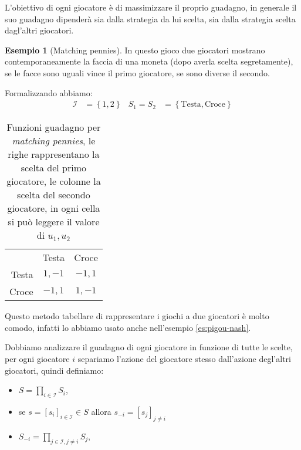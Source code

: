 \documentclass[a4paper]{article}
\newcounter{counter1}
\theoremstyle{plain}
\theoremstyle{definition}
\newtheorem{myes}[counter1]{Esempio}
\theoremstyle{remark}
\newcommand{\set}[1]{\left\{#1\right\}}
\newcommand{\bra}[1]{\left[#1\right]}
\begin{document}
L'obiettivo di ogni giocatore è di massimizzare il proprio guadagno,
in generale il suo guadagno dipenderà sia dalla strategia da lui
scelta, sia dalla strategia scelta dagl'altri giocatori.

\begin{myes}[Matching pennies]
\label{es:matching-pennies}
  In questo gioco due giocatori mostrano contemporaneamente la faccia
  di una moneta (dopo averla scelta segretamente), se le facce sono
  uguali vince il primo giocatore, se sono diverse il secondo.
  
  Formalizzando abbiamo:
  \begin{align*}
    \mathcal{I} &= \set{1,2} &
                               S_1 = S_2 &= \set{\text{Testa},\text{Croce}}
  \end{align*}
  \begin{table}[!ht]
    \centering
    \begin{tabular}{rcc}
      & Testa & Croce \\
      \cline{2-3}
      Testa & \multicolumn{1}{|c|}{$1,-1$} & \multicolumn{1}{|c|}{$-1,1$}  \\
      \cline{2-3}
      Croce & \multicolumn{1}{|c|}{$-1,1$} & \multicolumn{1}{|c|}{$1,-1$}  \\
      \cline{2-3}
    \end{tabular}
    
    \caption{Funzioni guadagno per \textit{matching pennies}, le righe
      rappresentano la scelta del primo giocatore, le colonne la scelta
      del secondo giocatore, in ogni cella si può leggere il valore di
      $u_1,u_2$}
    \label{tab:u1u2-matching-pennies}
  \end{table}
  Questo metodo tabellare di rappresentare i giochi a due giocatori è
  molto comodo, infatti lo abbiamo usato anche nell'esempio
  \ref{es:pigou-nash}.
\end{myes}

Dobbiamo analizzare il guadagno di ogni giocatore in funzione di tutte
le scelte, per ogni giocatore $i$ separiamo l'azione del giocatore
stesso dall'azione degl'altri giocatori, quindi definiamo:
\begin{itemize}
\item $S = \prod _{i\in\mathcal{I}} S_i$,
\item se $s = \bra{s_i}_{i\in\mathcal{I}} \in S$ allora $s_{-i} =
  \bra{s_j}_{j\neq i}$
\item $\displaystyle S_{-i} = \prod _{j\in\mathcal{I},j\neq i} S_j$,
\end{itemize}
\end{document}
